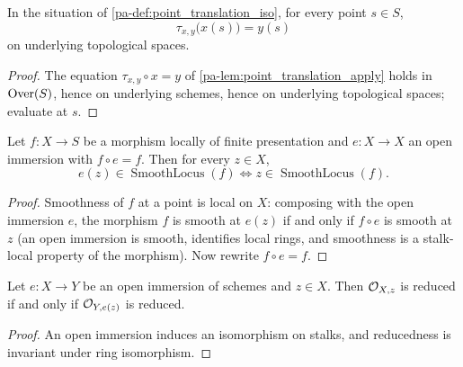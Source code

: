 \begin{lemma}
  \label{pa-lem:point_translation_iso_points}
  \leanok

  In the situation of \ref{pa-def:point_translation_iso}, for every point
  \(s \in S\),
  \[
    \tau_{x,y}\bigl(x(s)\bigr) = y(s)
  \]
  on underlying topological spaces.
\end{lemma}
\begin{proof}
  \leanok
  The equation \(\tau_{x,y} \circ x = y\) of \ref{pa-lem:point_translation_apply}
  holds in \(\mathrm{Over}(S)\), hence on underlying schemes, hence on underlying
  topological spaces; evaluate at \(s\).
\end{proof}

\begin{lemma}
  \label{pa-lem:smooth_locus_transport}
  \leanok

  Let \(f : X \to S\) be a morphism locally of finite presentation and
  \(e : X \to X\) an open immersion with \(f \circ e = f\). Then for every
  \(z \in X\),
  \[
    e(z) \in \operatorname{SmoothLocus}(f)
    \iff
    z \in \operatorname{SmoothLocus}(f).
  \]
\end{lemma}
\begin{proof}
  \leanok
  Smoothness of \(f\) at a point is local on \(X\): composing with the open
  immersion \(e\), the morphism \(f\) is smooth at \(e(z)\) if and only if
  \(f \circ e\) is smooth at \(z\) (an open immersion is smooth, identifies
  local rings, and smoothness is a stalk-local property of the morphism). Now
  rewrite \(f \circ e = f\).
\end{proof}

\begin{lemma}
  \label{pa-lem:stalk_reduced_transport}
  \leanok

  Let \(e : X \to Y\) be an open immersion of schemes and \(z \in X\). Then
  \(\mathcal{O}_{X,z}\) is reduced if and only if \(\mathcal{O}_{Y, e(z)}\) is reduced.
\end{lemma}
\begin{proof}
  \leanok
  An open immersion induces an isomorphism on stalks, and reducedness is
  invariant under ring isomorphism.
\end{proof}

